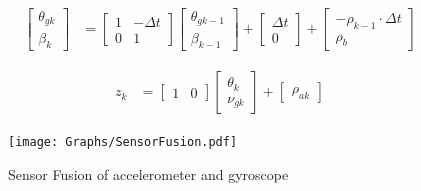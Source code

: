         \begin{equation}
            \begin{aligned}
                \begin{bmatrix}
                    \theta_{g{k}} \\
                    \beta_{k} 
                \end{bmatrix}
                &= 
                \begin{bmatrix}
                    1 & -\Delta t \\
                    0 & 1
                \end{bmatrix}
                \begin{bmatrix}
                    \theta_{g{k-1}} \\
                    \beta_{k-1}
                \end{bmatrix}
                +
                \begin{bmatrix}
                    \Delta t \\
                    0
                \end{bmatrix}
                + \begin{bmatrix}
                    -\rho_{k-1}\cdot\Delta t \\
                    \rho_b
                \end{bmatrix}
            \end{aligned}
            \label{eq:gyroBias1}
        \end{equation}
        
        \begin{equation}
            \begin{aligned}
                z_k &= \begin{bmatrix}
                    1 & 0
                \end{bmatrix}
                \begin{bmatrix}
                    \theta_k \\
                    \nu_{g{k}}
                \end{bmatrix}
                + \begin{bmatrix}
                    \rho_{a{k}}
                \end{bmatrix}
            \end{aligned}
            \label{eq:gyroBias2}
        \end{equation}
        

        \begin{figure}[H]
            \centering
            \texttt{[image: Graphs/SensorFusion.pdf]}
            \caption{Sensor Fusion of accelerometer and gyroscope}
            \label{fig:SensorFusion}
        \end{figure}

